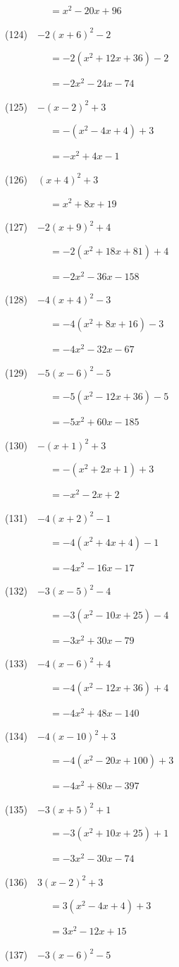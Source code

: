 \documentclass[a4j,twocolumn,10pt,fleqn]{jarticle}
\begin{document}
~~~~~~~~~$=x^2-20x +96$

(124)~~$-2(x +6)^2-2$

~~~~~~~~~$=-2(x^2 +12x +36)-2$

~~~~~~~~~$=-2x^2-24x-74$

(125)~~$-(x-2)^2 +3$

~~~~~~~~~$=-(x^2-4x +4) +3$

~~~~~~~~~$=-x^2 +4x-1$

(126)~~$(x +4)^2 +3$

~~~~~~~~~$=x^2 +8x +19$

(127)~~$-2(x +9)^2 +4$

~~~~~~~~~$=-2(x^2 +18x +81) +4$

~~~~~~~~~$=-2x^2-36x-158$

(128)~~$-4(x +4)^2-3$

~~~~~~~~~$=-4(x^2 +8x +16)-3$

~~~~~~~~~$=-4x^2-32x-67$

(129)~~$-5(x-6)^2-5$

~~~~~~~~~$=-5(x^2-12x +36)-5$

~~~~~~~~~$=-5x^2 +60x-185$

(130)~~$-(x +1)^2 +3$

~~~~~~~~~$=-(x^2 +2x +1) +3$

~~~~~~~~~$=-x^2-2x +2$

(131)~~$-4(x +2)^2-1$

~~~~~~~~~$=-4(x^2 +4x +4)-1$

~~~~~~~~~$=-4x^2-16x-17$

(132)~~$-3(x-5)^2-4$

~~~~~~~~~$=-3(x^2-10x +25)-4$

~~~~~~~~~$=-3x^2 +30x-79$

(133)~~$-4(x-6)^2 +4$

~~~~~~~~~$=-4(x^2-12x +36) +4$

~~~~~~~~~$=-4x^2 +48x-140$

(134)~~$-4(x-10)^2 +3$

~~~~~~~~~$=-4(x^2-20x +100) +3$

~~~~~~~~~$=-4x^2 +80x-397$

(135)~~$-3(x +5)^2 +1$

~~~~~~~~~$=-3(x^2 +10x +25) +1$

~~~~~~~~~$=-3x^2-30x-74$

(136)~~$3(x-2)^2 +3$

~~~~~~~~~$=3(x^2-4x +4) +3$

~~~~~~~~~$=3x^2-12x +15$

(137)~~$-3(x-6)^2-5$
\end{document}
